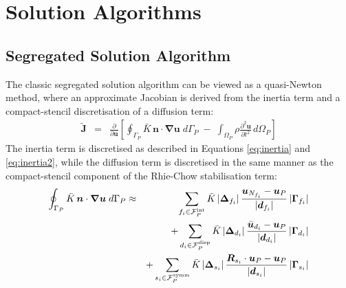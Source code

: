 \documentclass[sn-mathphys,Numbered]{sn-jnl}%
\newcommand{\bb}{\boldsymbol}
\begin{document}
\section{Solution Algorithms}\label{sec:sol_alg}


\subsection{Segregated Solution Algorithm} 
\label{sec:seg_alg}
The classic segregated solution algorithm can be viewed as a quasi-Newton method, where an approximate Jacobian is derived from the inertia term and a compact-stencil discretisation of a diffusion term:
\begin{eqnarray} \label{eq:diffusion}
	\tilde{\bb{J}} &=& \frac{\partial}{\partial \bb{u}} \left[ \oint_{\Gamma_P} \bar{K} \, \bb{n} \cdot \bb{\nabla} \bb{u} \; d\Gamma_P
	 \; -\;  \int_{\Omega_P} \rho \frac{\partial^2 \bb{u} }{\partial t^2} \, d\Omega_P \right]
\end{eqnarray}
The inertia term is discretised as described in Equations \ref{eq:inertia} and \ref{eq:inertia2}, while the diffusion term is discretised in the same manner as the compact-stencil component of the Rhie-Chow stabilisation term:
\begin{eqnarray}
	\oint_{\Gamma_P} \bar{K} \, \bb{n} \cdot \bb{\nabla} \bb{u} \; d\Gamma_P &\approx&
		\sum_{f_i \in \mathcal{F}^{\text{int}}_P}  \bar{K}
		\left|\bb{\Delta}_{f_i} \right| \frac{ \bb{u}_{N_{f_i}} - \bb{u}_P}{\left|\bb{d}_{f_i}\right|}    \left|\bb{\Gamma}_{f_i}\right| \notag \\
	&&+  \sum_{d_i \in \mathcal{F}^{\text{disp}}_P}  \bar{K}
		\left|\bb{\Delta}_{d_i} \right| \frac{ \bar{\bb{u}}_{d_i}  - \bb{u}_P}{\left|\bb{d}_{d_i}\right|} 
		\left|\bb{\Gamma}_{d_i}\right| \notag \\
	&&+ \sum_{s_i \in \mathcal{F}^{\text{symm}}_P}  \bar{K}
		\left|\bb{\Delta}_{s_i} \right| \frac{ \bb{R}_{s_i} \cdot \bb{u}_{P} - \bb{u}_P}{\left|\bb{d}_{s_i}\right|}
		\left|\bb{\Gamma}_{s_i}\right|
\end{eqnarray}
\end{document}
